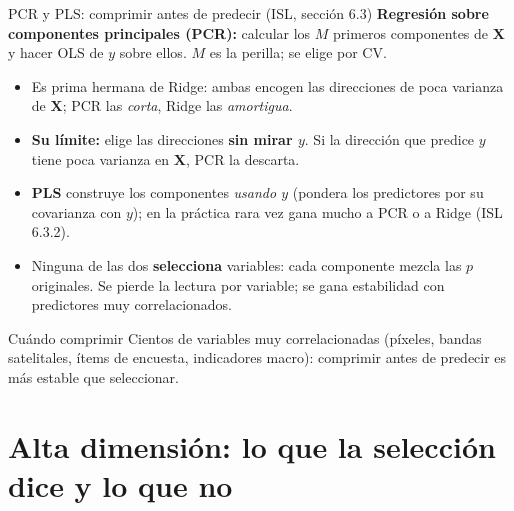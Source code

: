 \documentclass{beamer}
\newcommand{\1}{\mathbb{I}}
\begin{document}
\begin{frame}{PCR y PLS: comprimir antes de predecir (ISL, sección 6.3)}
\small
\textbf{Regresión sobre componentes principales (PCR):} calcular los $M$ primeros componentes de $\mathbf{X}$ y hacer OLS de $y$ sobre ellos. $M$ es la perilla; se elige por CV.
\pause
\begin{itemize}\itemsep3pt
  \item Es prima hermana de Ridge: ambas encogen las direcciones de poca varianza de $\mathbf{X}$; PCR las \emph{corta}, Ridge las \emph{amortigua}. \pause
  \item \textbf{Su límite:} elige las direcciones \textbf{sin mirar $y$}. Si la dirección que predice $y$ tiene poca varianza en $\mathbf{X}$, PCR la descarta. \pause
  \item \textbf{PLS} construye los componentes \emph{usando $y$} (pondera los predictores por su covarianza con $y$); en la práctica rara vez gana mucho a PCR o a Ridge (ISL 6.3.2). \pause
  \item Ninguna de las dos \textbf{selecciona} variables: cada componente mezcla las $p$ originales. Se pierde la lectura por variable; se gana estabilidad con predictores muy correlacionados.
\end{itemize}
\pause
\begin{block}{Cuándo comprimir}
Cientos de variables muy correlacionadas (píxeles, bandas satelitales, ítems de encuesta, indicadores macro): comprimir antes de predecir es más estable que seleccionar.
\end{block}
\end{frame}


\section{Alta dimensión: lo que la selección dice y lo que no}
\begin{frame}[noframenumbering]
\tableofcontents[currentsection]
\end{frame}
\end{document}
